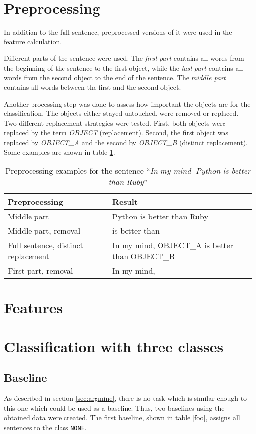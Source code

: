 \section{Preprocessing}
In addition to the full sentence, preprocessed versions of it were used in the feature calculation.

Different parts of the sentence were used. The \emph{first part} contains all words from the beginning of the sentence to the first object, while the \emph{last part} contains all words from the second object to the end of the sentence. The \emph{middle part} contains all words between the first and the second object.

Another processing step was done to assess how important the objects are for the classification. The objects either stayed untouched, were removed or replaced. Two different replacement strategies were tested. First, both objects were replaced by the term \emph{OBJECT} (replacement). Second, the first object was replaced by \emph{OBJECT\_A} and the second by \emph{OBJECT\_B} (distinct replacement). Some examples are shown in table \ref{preprocessing_example}.

\begin{table}[h]
\centering
\label{preprocessing_example}
\caption{Preprocessing examples for the sentence \enquote{\emph{In my mind, Python is better than Ruby}}}
\begin{tabularx}{\linewidth}{lX}
\toprule
Preprocessing & Result \\ \midrule
Middle part & Python is better than Ruby \\
Middle part, removal & is better than \\
Full sentence, distinct replacement &In my mind, OBJECT\_A is better than OBJECT\_B \\
First part, removal & In my mind, \\
\bottomrule
\end{tabularx}

\end{table}


\section{Features}


\section{Classification with three classes}
\subsection{Baseline}
\label{sec:baseline}
As described in section \ref{sec:argmine}, there is no task which is similar enough to this one which could be used as a baseline. Thus, two baselines using the obtained data were created. The first baseline, shown in table \ref{foo}, assigns all sentences to the class \texttt{NONE}.

